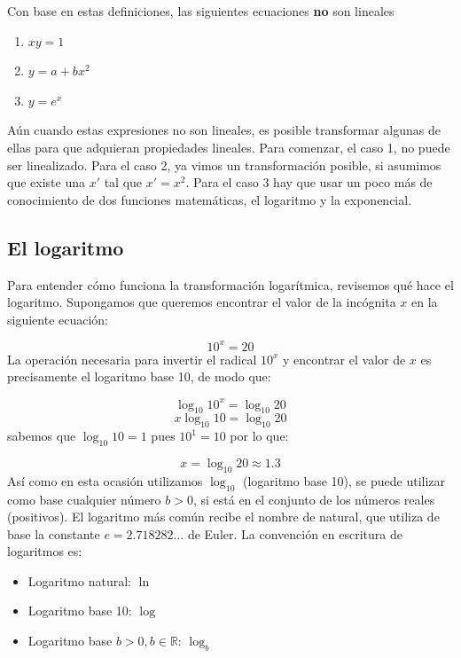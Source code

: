 \documentclass[
]{book}
\providecommand{\tightlist}{%
  \setlength{\itemsep}{0pt}\setlength{\parskip}{0pt}}
\begin{document}
Con base en estas definiciones, las siguientes ecuaciones \textbf{no} son lineales

\begin{enumerate}
\def\labelenumi{\arabic{enumi}.}
\tightlist
\item
  \(xy = 1\)
\item
  \(y = a + b x^2\)
\item
  \(y = e^x\)
\end{enumerate}

Aún cuando estas expresiones no son lineales, es posible transformar algunas de ellas para que adquieran propiedades lineales. Para comenzar, el caso 1, no puede ser linealizado. Para el caso 2, ya vimos un transformación posible, si asumimos que existe una \(x'\) tal que \(x' = x^2\). Para el caso 3 hay que usar un poco más de conocimiento de dos funciones matemáticas, el logaritmo y la exponencial.

\hypertarget{el-logaritmo}{%
\subsection{El logaritmo}\label{el-logaritmo}}

Para entender cómo funciona la transformación logarítmica, revisemos qué hace el logaritmo. Supongamos que queremos encontrar el valor de la incógnita \(x\) en la siguiente ecuación:

\[10^x = 20\]
La operación necesaria para invertir el radical \(10^x\) y encontrar el valor de \(x\) es precisamente el logaritmo base 10, de modo que:

\[\log_{10} 10^x = \log_{10} 20\]
\[x \log_{10} 10 = \log_{10} 20\]
sabemos que \(\log_{10} 10 = 1\) pues \(10^1 = 10\) por lo que:

\[x = \log_{10} 20 \approx 1.3\]
Así como en esta ocasión utilizamos \(\log_{10}\) (logaritmo base 10), se puede utilizar como base cualquier número \(b > 0\), si está en el conjunto de los números reales (positivos). El logaritmo más común recibe el nombre de natural, que utiliza de base la constante \(e = 2.718282 ...\) de Euler. La convención en escritura de logaritmos es:

\begin{itemize}
\tightlist
\item
  Logaritmo natural: \(\ln\)
\item
  Logaritmo base 10: \(\log\)
\item
  Logaritmo base \(b > 0, b \in \mathbb{R}\): \(\log_b\)
\end{itemize}
\end{document}

